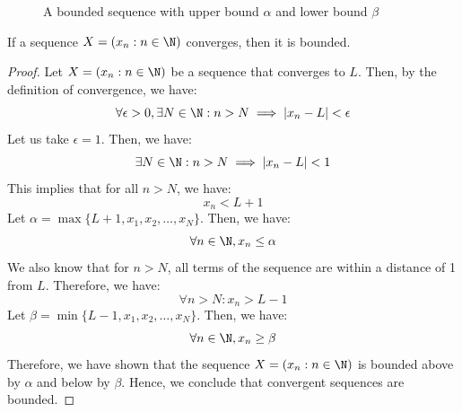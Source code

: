 \documentclass[openany]{book}
\begin{document}
\begin{figure}[H]
    \centering
    \caption{A bounded sequence with upper bound $\alpha$ and lower bound $\beta$}
    \label{fig:bounded_sequence}
\end{figure}
\begin{mytheorem}
    If a sequence $X = (x_n : n \in \N)$ converges, then it is bounded. 
\end{mytheorem}
\begin{proof}
    Let $X = (x_n : n \in \N)$ be a sequence that converges to $L$. Then, by the definition of convergence, we have:
    $$\forall \epsilon > 0, \exists N \in \N: n > N \implies |x_n - L| < \epsilon$$
    Let us take $\epsilon = 1$. Then, we have:
    $$\exists N \in \N: n > N \implies |x_n - L| < 1$$
    This implies that for all $n > N$, we have:
    $$x_n < L + 1$$
    Let $\alpha = \max\{L + 1, x_1, x_2, \ldots, x_N\}$. 
    Then, we have:
    $$\forall n \in \N, x_n \leq \alpha$$
    We also know that for $n > N$, all terms of the sequence are within a distance of 1 from $L$. Therefore, we have:
    $$\forall n> N: x_n > L - 1$$
    Let $\beta = \min\{L - 1, x_1, x_2, \ldots, x_N\}$. 
    Then, we have:
    $$\forall n \in \N, x_n \geq\beta$$
    Therefore, we have shown that the sequence $X = (x_n : n \in \N)$ is bounded above by $\alpha$ and below by $\beta$. Hence, we conclude that convergent sequences are bounded.
\end{proof}
\end{document}
